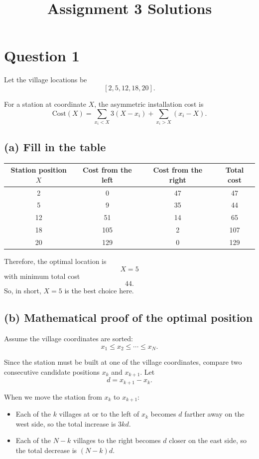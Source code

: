 \documentclass[12pt]{article}
\title{Assignment 3 Solutions}
\author{}
\date{}
\begin{document}
\maketitle

\section*{Question 1}

Let the village locations be
\[
[2,5,12,18,20].
\]

For a station at coordinate \(X\), the asymmetric installation cost is
\[
\mathrm{Cost}(X)=\sum_{x_i<X} 3(X-x_i) + \sum_{x_i>X} (x_i-X).
\]

\subsection*{(a) Fill in the table}

\begin{center}
\begin{tabular}{@{}cccc@{}}
\toprule
Station position \(X\) & Cost from the left & Cost from the right & Total cost \\
\midrule
2  & 0   & 47 & 47 \\
5  & 9   & 35 & 44 \\
12 & 51  & 14 & 65 \\
18 & 105 & 2  & 107 \\
20 & 129 & 0  & 129 \\
\bottomrule
\end{tabular}
\end{center}

Therefore, the optimal location is
\[
X=5
\]
with minimum total cost
\[
44.
\]
So, in short, \(X=5\) is the best choice here.

\subsection*{(b) Mathematical proof of the optimal position}

Assume the village coordinates are sorted:
\[
x_1 \le x_2 \le \cdots \le x_N.
\]

Since the station must be built at one of the village coordinates, compare two consecutive candidate positions \(x_k\) and \(x_{k+1}\). Let
\[
d=x_{k+1}-x_k.
\]

When we move the station from \(x_k\) to \(x_{k+1}\):
\begin{itemize}
    \item Each of the \(k\) villages at or to the left of \(x_k\) becomes \(d\) farther away on the west side, so the total increase is \(3kd\).
    \item Each of the \(N-k\) villages to the right becomes \(d\) closer on the east side, so the total decrease is \((N-k)d\).
\end{itemize}
\end{document}
